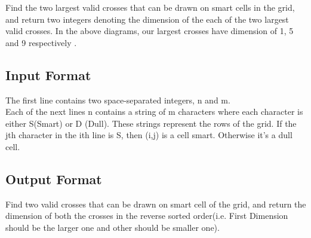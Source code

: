 \documentclass[12pt]{article}
\begin{document}
Find the two largest valid crosses that can be drawn on smart cells in the grid, and return two integers denoting the dimension of the each of the two largest valid crosses. In the above diagrams, our largest crosses have dimension of 1, 5 and 9 respectively .

\subsection{Input Format}
The first line contains two space-separated integers, n and m.\\
Each of the next lines n contains a string of m characters where each character is either S(Smart) or D (Dull). These strings represent the rows of the grid. If the jth character in the ith line is S, then (i,j) is a cell smart. Otherwise it's a dull cell.


\subsection{Output Format}
Find two valid crosses that can be drawn on smart cell of the grid, and return the dimension of both the crosses in the reverse sorted order(i.e. First Dimension should be the larger one and other should be smaller one).


\newpage
\end{document}
